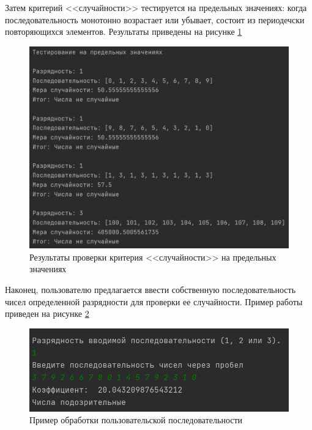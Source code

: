\documentclass[14pt, a4paper]{extarticle}
\begin{document}
\newpage
Затем критерий <<случайности>> тестируется на предельных значениях: когда последовательность монотонно возрастает или убывает, состоит из периодечски повторяющихся элементов. Результаты приведены на рисунке \ref{pic:3}
\begin{figure}[h]
	\begin{center}
		{\includegraphics[scale=0.45]{pictures/res_limit.png}
			\caption{Результаты проверки критерия <<случайности>> на предельных значениях}
			\label{pic:3}}
	\end{center}
\end{figure}


\newpage
Наконец, пользователю предлагается ввести собственную последовательность чисел определенной разрядности для проверки ее случайности. Пример работы приведен на рисунке \ref{pic:4}
\begin{figure}[h]
	\begin{center}
		{\includegraphics[scale=0.45]{pictures/res_user.png}
			\caption{Пример обработки пользовательской последовательности}
			\label{pic:4}}
	\end{center}
\end{figure}
\end{document}
